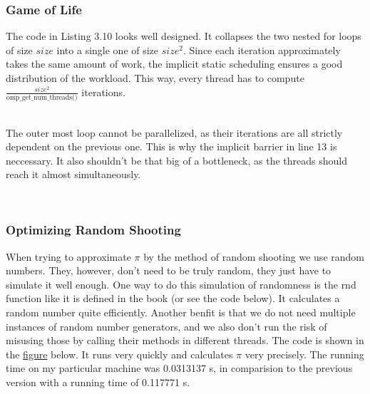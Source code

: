 \documentclass[../../main.tex]{subfiles}
\begin{document}
\subsubsection{Game of Life}
The code in Listing 3.10 looks well designed.
It collapses the two nested for loops of size $size$ into a single one of size $size^2$.
Since each iteration approximately takes the same amount of work, the implicit static scheduling ensures a good distribution of the workload.
This way, every thread has to compute \( \frac{size^2}{\text{omp\_get\_num\_threads()}} \) iterations.

~\\
The outer most loop cannot be parallelized, as their iterations are all strictly dependent on the previous one.
This is why the implicit barrier in line 13 is neccessary.
It also shouldn't be that big of a bottleneck, as the threads should reach it almost simultaneously.


~\\
\subsubsection{Optimizing Random Shooting}
When trying to approximate $\pi$ by the method of random shooting we use random numbers.
They, however, don't need to be truly random, they just have to simulate it well enough.
One way to do this simulation of randomness is the rnd function like it is defined in the book (or see the code below).
It calculates a random number quite efficiently.
Another benfit is that we do not need multiple instances of random number generators, and we also don't run the risk of misusing those by calling their methods in different threads.
The code is shown in the \hyperref[fig:calculate_pi_v2]{figure} below.
It runs very quickly and calculates $\pi$ very precisely.
The running time on my particular machine was 0.0313137 s, in comparision to the previous version with a running time of 0.117771 s.
\end{document}
